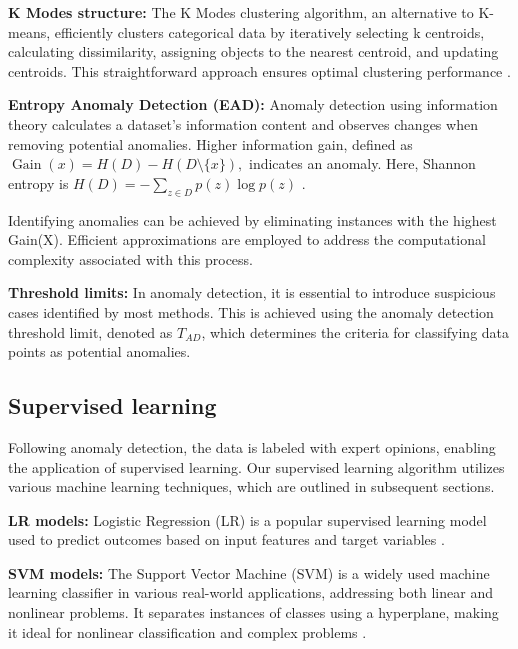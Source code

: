 \documentclass[12pt]{article}
\begin{document}
\textbf{\small K Modes structure:} The K Modes clustering
algorithm, an alternative to K-means, efficiently clusters
categorical data by iteratively selecting k centroids, calculating
dissimilarity, assigning objects to the nearest centroid, and
updating centroids. This straightforward approach ensures optimal
clustering performance \cite{A60}.

\textbf{\small Entropy Anomaly Detection (EAD):} Anomaly detection
using information theory calculates a dataset's information
content and observes changes when removing potential anomalies.
Higher information gain, defined as $\operatorname{Gain}(x) =
H(D)-H(D\setminus\{x\}),$ indicates an anomaly. Here, Shannon entropy is
$H(D)=-\sum_{z\in D}p(z)\log p(z)$
\cite{A57}.

Identifying anomalies can be achieved by eliminating instances
with the highest Gain(X). Efficient approximations are employed to
address the computational complexity associated with this process.

\textbf{\small Threshold limits:} In anomaly detection, it is
essential to introduce suspicious cases identified by most
methods. This is achieved using the anomaly detection threshold
limit, denoted as $T_{AD}$, which determines the criteria for
classifying data points as potential anomalies.


\subsection{Supervised learning}\label{SSC:ML}
Following anomaly detection, the data is labeled with expert
opinions, enabling the application of supervised learning. Our
supervised learning algorithm utilizes various machine learning
techniques, which are outlined in subsequent sections.

\textbf{\small LR models:} Logistic Regression (LR) is a popular
supervised learning model used to predict outcomes based on input
features and target variables \cite{A52}.

\textbf{\small SVM models:} The Support Vector Machine (SVM) is a
widely used machine learning classifier in various real-world
applications, addressing both linear and nonlinear problems. It
separates instances of classes using a hyperplane, making it ideal
for nonlinear classification and complex problems \cite{A52}.
\end{document}
